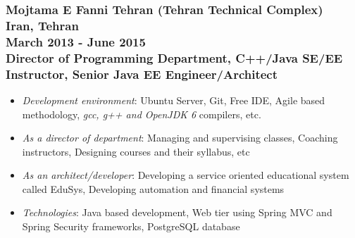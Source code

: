 \documentclass[10pt,a4paper]{article}
\begin{document}
\subsubsection{{\large Mojtama E Fanni Tehran (Tehran Technical Complex)} \\ \textnormal{Iran, Tehran} \\ \textnormal{March 2013 - June 2015} \\ {Director of Programming Department, C++/Java SE/EE Instructor, Senior Java EE Engineer/Architect}}
  \setlength{\leftskip}{0.5cm}
  \setlength{\rightskip}{1cm}
  \begin{itemize}
    \setlength{\rightskip}{1cm}
    \setlength\itemsep{0em}
    \item \small \textit {Development environment}: Ubuntu Server, Git, Free IDE, Agile based methodology, \textit {gcc, g++ and OpenJDK 6} compilers, etc.    
    \item \small \textit {As a director of department}: Managing and supervising classes, Coaching instructors, Designing courses and their syllabus, etc
    \item \small \textit {As an architect/developer}: Developing a service oriented educational system called EduSys, Developing automation and financial systems
    \item \small \textit {Technologies}: Java based development, Web tier using Spring MVC and Spring Security frameworks, PostgreSQL database
  \end{itemize}
  \setlength{\leftskip}{0pt}
  \setlength{\rightskip}{0cm}
	  
\end{document}
